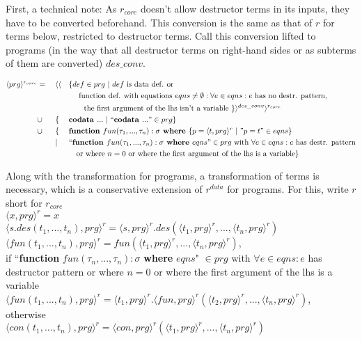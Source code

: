 First, a technical note: As $r_{core}$ doesn't allow destructor terms in its inputs, they have to be converted beforehand. This conversion is the same as that of $r$ for terms below, restricted to destructor terms. Call this conversion lifted to programs (in the way that all destructor terms on right-hand sides or as subterms of them are converted) $des\_conv$.

\begin{alignat*}{3}
\langle prg \rangle^{r_{core}} & = ~&& \langle \langle && \{ def \in prg ~ | ~ def \textrm{ is data def. or} \\ & && &&\quad \textrm{ function def. with equations } eqns \neq \emptyset: \forall e \in eqns: e \textrm{ has no destr. pattern}, \\
& && &&\qquad \textrm{the first argument of the lhs isn't a variable } \} \rangle^{des\_conv} \rangle^{r_{core}} \\
& \cup && \{ && \textrm{\textbf{codata }} ... ~ | ~ `` \textrm{\textbf{codata }} ... " \in prg \} \\
& \cup && \{ && \textrm{\textbf{function }} fun(\tau_1, ..., \tau_n): \sigma \textrm{\textbf{ where }} \{ p = \langle t, prg \rangle^r ~ | ~ "p = t" \in eqns \} \\
& && | && `` \textrm{\textbf{function }} fun(\tau_1, ..., \tau_n): \sigma \textrm{\textbf{ where }} eqns " \in prg \textrm{ with } \forall e \in eqns: e \textrm{ has destr. pattern} \\
& && &&\quad \textrm{or where } n = 0 \textrm{ or where the first argument of the lhs is a variable} \} 
\end{alignat*}

Along with the transformation for programs, a transformation of terms is necessary, which is a conservative extension of $r^{data}$ for programs. For this, write $r$ short for $r_{core}$ \\
$\langle x, prg \rangle^r = x$ \\
$\langle s.des(t_1, ..., t_n), prg \rangle^r = \langle s, prg \rangle^r .des(\langle t_1, prg \rangle^r, ..., \langle t_n, prg \rangle^r)$ \\
$\langle fun(t_1, ..., t_n), prg \rangle^r = fun(\langle t_1, prg \rangle^r, ..., \langle t_n, prg \rangle^r)$, \\
if ``\textbf{function} $fun(\tau_n, ..., \tau_n): \sigma$ \textbf{where} $eqns$" $\in prg$  with $\forall e \in eqns: e$ has destructor pattern or where $n = 0$ or where the first argument of the lhs is a variable \\
$\langle fun(t_1, ..., t_n), prg \rangle^r = \langle t_1, prg \rangle^r .\langle fun, prg \rangle^r (\langle t_2, prg \rangle^r, ..., \langle t_n, prg \rangle^r)$, \\
otherwise \\
$\langle con(t_1, ..., t_n), prg \rangle^r = \langle con, prg \rangle^r (\langle t_1, prg \rangle^r, ..., \langle t_n, prg \rangle^r)$ \\

